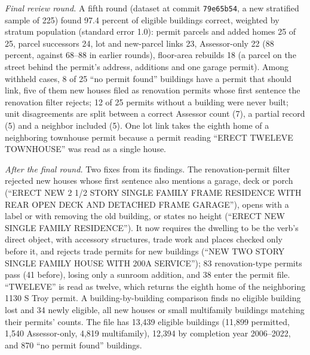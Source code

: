 \textit{Final review round.} A fifth round (dataset at commit \texttt{79e65b54}, a new stratified sample of 225) found
97.4 percent of eligible buildings correct, weighted by stratum population (standard error 1.0): permit parcels and
added homes 25 of 25, parcel successors 24, lot and new-parcel links 23, Assessor-only 22 (88 percent, against 68--88 in
earlier rounds), floor-area rebuilds 18 (a parcel on the street behind the permit's address, additions and one garage
permit). Among withheld cases, 8 of 25 ``no permit found'' buildings have a permit that should link, five of them new
houses filed as renovation permits whose first sentence the renovation filter rejects; 12 of 25 permits without a
building were never built; unit disagreements are split between a correct Assessor count (7), a partial record (5) and
a neighbor included (5). One lot link takes the eighth home of a neighboring townhouse permit because a permit reading
``ERECT TWELEVE TOWNHOUSE'' was read as a single house.

\textit{After the final round.} Two fixes from its findings. The renovation-permit filter rejected new houses whose
first sentence also mentions a garage, deck or porch (``ERECT NEW 2 1/2 STORY SINGLE FAMILY FRAME RESIDENCE WITH REAR
OPEN DECK AND DETACHED FRAME GARAGE''), opens with a label or with removing the old building, or states no height
(``ERECT NEW SINGLE FAMILY RESIDENCE''). It now requires the dwelling to be the verb's direct object, with accessory
structures, trade work and places checked only before it, and rejects trade permits for new buildings (``NEW TWO STORY
SINGLE FAMILY HOUSE WITH 200A SERVICE''); 83 renovation-type permits pass (41 before), losing only a sunroom addition,
and 38 enter the permit file. ``TWELEVE'' is read as twelve, which returns the eighth home of the neighboring 1130 S
Troy permit. A building-by-building comparison finds no eligible building lost and 34 newly eligible, all new houses
or small multifamily buildings matching their permits' counts. The file has 13,439 eligible buildings (11,899
permitted, 1,540 Assessor-only, 4,819 multifamily), 12,394 by completion year 2006--2022, and 870 ``no permit found''
buildings.
